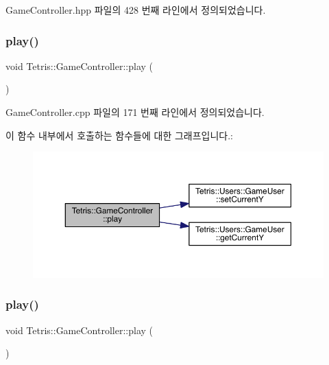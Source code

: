 Game\+Controller.\+hpp 파일의 428 번째 라인에서 정의되었습니다.

\mbox{\label{class_tetris_1_1_game_controller_a766a7537d955c62969f2e4b7c0b3c73d}} 
\subsubsection{\texorpdfstring{play()}{play()}\hspace{0.1cm}{\footnotesize\ttfamily [1/2]}}
{\footnotesize\ttfamily void Tetris\+::\+Game\+Controller\+::play (\begin{DoxyParamCaption}{ }\end{DoxyParamCaption})}



Game\+Controller.\+cpp 파일의 171 번째 라인에서 정의되었습니다.

이 함수 내부에서 호출하는 함수들에 대한 그래프입니다.\+:
\nopagebreak
\begin{figure}[H]
\begin{center}
\leavevmode
\includegraphics[width=350pt]{class_tetris_1_1_game_controller_a766a7537d955c62969f2e4b7c0b3c73d_cgraph}
\end{center}
\end{figure}
\mbox{\label{class_tetris_1_1_game_controller_a766a7537d955c62969f2e4b7c0b3c73d}} 
\subsubsection{\texorpdfstring{play()}{play()}\hspace{0.1cm}{\footnotesize\ttfamily [2/2]}}
{\footnotesize\ttfamily void Tetris\+::\+Game\+Controller\+::play (\begin{DoxyParamCaption}{ }\end{DoxyParamCaption})\hspace{0.3cm}{\ttfamily [inline]}}



